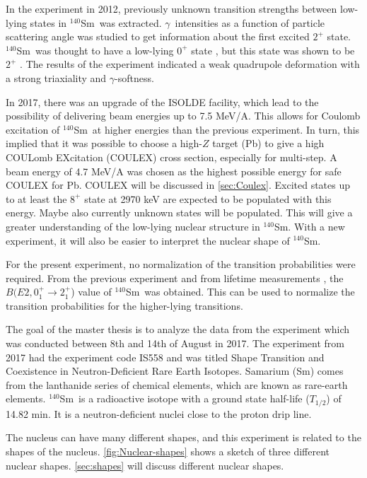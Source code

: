 \documentclass[twoside,english]{uiofysmaster/uiofysmaster}
\newcommand{\Sm}{$^{140}$Sm} %
\newcommand{\ga}{$\gamma$}
\let\orgautoref\autoref
\renewcommand{\autoref}
        {%
		 \def\sectionautorefname{Section}%
		 \def\subsectionautorefname{Section}%
		 \def\subsubsectionautorefname{Section}%
		 \def\chapterautorefname{Chapter}%
          \orgautoref}
\begin{document}
In the experiment in 2012, previously unknown transition strengths between low-lying states in \Sm\ was extracted. 
\ga\ intensities as a function of particle scattering angle was studied to get information about the first excited $2^+$ state.
\Sm\ was thought to have a low-lying $0^+$ state \cite{Firestone}, but this state was shown to be $2^+$ \cite{Samorajczyk2015}. 
The results of the experiment indicated a weak quadrupole deformation with a strong triaxiality and \ga-softness.

In 2017, there was an upgrade of the ISOLDE facility, which lead to the possibility of delivering beam energies up to 7.5 MeV/A. 
This allows for Coulomb excitation of \Sm\ at higher energies than the previous experiment.
In turn, this implied that it was possible to choose a high-$Z$ target (Pb) to give a high COULomb EXcitation (COULEX) cross section, especially for multi-step.
A beam energy of 4.7 MeV/A was chosen as the highest possible energy for safe COULEX for Pb.
COULEX will be discussed in \autoref{sec:Coulex}.
Excited states up to at least the $8^+$ state at 2970 keV are expected to be populated with this energy.
Maybe also currently unknown states will be populated.
This will give a greater understanding of the low-lying nuclear structure in \Sm.
With a new experiment, it will also be easier to interpret the nuclear shape of \Sm.

For the present experiment, no normalization of the transition probabilities were required.
From the previous experiment \cite{Klintefjord2016} and from lifetime measurements \cite{BelloGarrote2015}, the $B(E2, 0_1^+ \rightarrow 2_1^+$) value of \Sm\ was obtained. 
This can be used to normalize the transition probabilities for the higher-lying transitions.

The goal of the master thesis is to analyze the data from the experiment which was conducted between 8th and 14th of August in 2017.  
The experiment from 2017 had the experiment code IS558 and was titled Shape Transition and Coexistence in Neutron-Deficient Rare Earth Isotopes.
Samarium (Sm) comes from the lanthanide series of chemical elements, which are known as rare-earth elements.
\Sm\ is a radioactive isotope with a ground state half-life ($T_{1/2}$) of 14.82 min. 
It is a neutron-deficient nuclei close to the proton drip line.

The nucleus can have many different shapes, and this experiment is related to the shapes of the nucleus. 
\autoref{fig:Nuclear-shapes} shows a sketch of three different nuclear shapes. 
\autoref{sec:shapes} will discuss different nuclear shapes.
\end{document}
